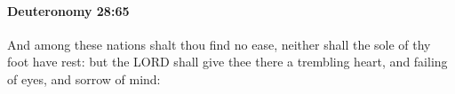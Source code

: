 
		\paragraph{Deuteronomy 28:65} %
			\label{DEUTERONOMY-28-65}

			And among these nations shalt thou find no ease, neither shall the sole of thy foot have rest: but the LORD shall give thee there a trembling heart, and failing of eyes, and sorrow of mind:


